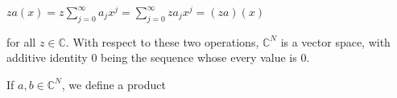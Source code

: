 $za(x) = z \sum_{j=0}^{\infty} a_j x^j = \sum_{j=0}^{\infty} za_j x^j = (za)(x)$

for all $z \in \mathbb{C}$. With respect to these two operations, $\mathbb{C}^N$ is a vector space, with additive identity 0 being the sequence whose every value is 0.

If $a, b \in \mathbb{C}^N$, we define a product
